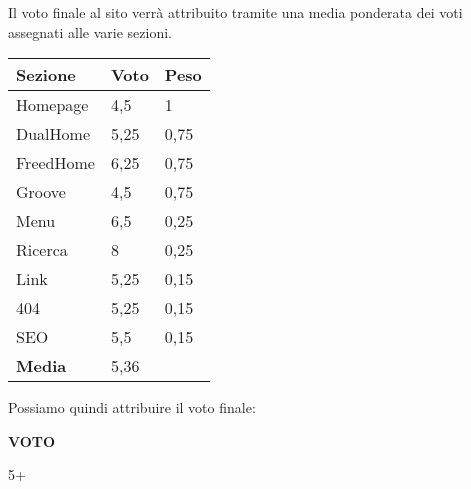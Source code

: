 Il voto finale al sito verrà attribuito tramite una media ponderata dei voti assegnati alle varie sezioni.
\renewcommand{\arraystretch}{1.2}
\begin{table}[H]
	\centering
	\begin{tabular}{C{3cm}C{3cm}C{3cm}}
		\textbf{Sezione} & \textbf{Voto} & \textbf{Peso} \\
		\hline
		Homepage & 4,5 & 1 \\
		DualHome & 5,25 & 0,75 \\
		FreedHome & 6,25 & 0,75 \\
		Groove & 4,5 & 0,75 \\
		Menu & 6,5 & 0,25 \\
		Ricerca & 8 & 0,25 \\
		Link & 5,25 & 0,15 \\
		404 & 5,25 & 0,15 \\
		SEO & 5,5 & 0,15 \\
		\hline
		\textbf{Media} & 5,36 & \\
	\end{tabular}

\end{table}

Possiamo quindi attribuire il voto finale:
\begin{center}
    \begin{huge}
    \textbf{VOTO}\\
    \vspace{0.1cm}
    \end{huge}
    \begin{Huge}
    5+
    \end{Huge}
\end{center}